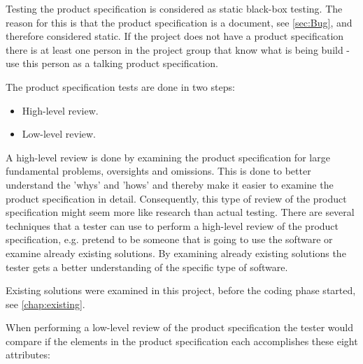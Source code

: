 Testing the product specification is considered as static black-box testing.
The reason for this is that the product specification is a document, see \cref{sec:Bug}, and therefore considered static.
If the project does not have a product specification there is at least one person in the project group that know what is being build - use this person as a talking product specification. \cite{SoftwareTesting}

The product specification tests are done in two steps:
\begin{itemize}
	\item High-level review.
	\item Low-level review.
\end{itemize}

A high-level review is done by examining the product specification for large fundamental problems, oversights and omissions.
This is done to better understand the 'whys' and 'hows' and thereby make it easier to examine the product specification in detail.
Consequently, this type of review of the product specification might seem more like research than actual testing.
There are several techniques that a tester can use to perform a high-level review of the product specification, e.g. pretend to be someone that is going to use the software or examine already existing solutions.
By examining already existing solutions the tester gets a better understanding of the specific type of software. \cite{SoftwareTesting}

Existing solutions were examined in this project, before the coding phase started, see \cref{chap:existing}.

When performing a low-level review of the product specification the tester would compare if the elements in the product specification each accomplishes these eight attributes: \cite{SoftwareTesting}

